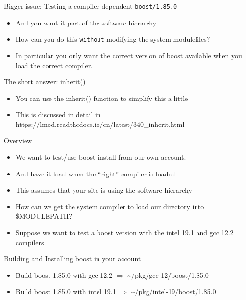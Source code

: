 \documentclass{beamer}
\begin{document}
\begin{frame}{Bigger issue: Testing a compiler dependent \texttt{boost/1.85.0}}
  \begin{itemize}
    \item And you want it part of the software hierarchy
    \item How can you do this \texttt{without} modifying the system
      modulefiles?
    \item In particular you only want the correct version of boost
      available when you load the correct compiler.
  \end{itemize}
\end{frame}

\begin{frame}{The short answer: inherit()}
  \begin{itemize}
    \item You can use the inherit() function to simplify this a little
    \item This is discussed in detail in https://lmod.readthedocs.io/en/latest/340\_inherit.html
  \end{itemize}
\end{frame}

\begin{frame}{Overview}
  \begin{itemize}
    \item We want to test/use boost install from our own account.
    \item And have it load when the ``right'' compiler is loaded
    \item This assumes that your site is using the software hierarchy
    \item How can we get the system compiler to load our directory
      into \$MODULEPATH?
    \item Suppose we want to test a boost version with the intel 19.1
      and gcc 12.2 compilers
  \end{itemize}
\end{frame}

\begin{frame}{Building and Installing boost in your account}
  \begin{itemize}
    \item Build boost 1.85.0 with gcc 12.2 $\Rightarrow$ \textasciitilde/pkg/gcc-12/boost/1.85.0
    \item Build boost 1.85.0 with intel 19.1 $\Rightarrow$ \textasciitilde/pkg/intel-19/boost/1.85.0
  \end{itemize}
\end{frame}
\end{document}
